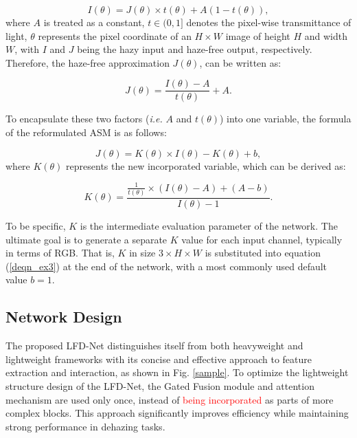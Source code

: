 \documentclass[lettersize,journal]{IEEEtran}
\begin{document}
\begin{equation}
    \label{deqn_ex1}
    I(\theta) = J(\theta) \times t(\theta) + A(1 - t(\theta)),
\end{equation}
where $A$ is treated as a constant, $t\in (0,1]$ denotes the pixel-wise transmittance of light, $\theta$ represents the pixel coordinate of an $H \times W$ image of height $H$ and width $W$, with $I$ and $J$ being the hazy input and haze-free output, respectively. Therefore, the haze-free approximation $J(\theta)$, can be written as:

\begin{equation}
    \label{deqn_ex2}
    J(\theta) = \frac{I(\theta) - A}{t(\theta)} + A.
\end{equation}

To encapsulate these two factors (\textit{i.e.} $A$ and $t(\theta)$) into one variable, the formula of the reformulated ASM is as follows:

\begin{equation}
    \label{deqn_ex3}
    J(\theta) = K(\theta) \times I(\theta) - K(\theta) + b,
\end{equation}
where $K(\theta)$ represents the new incorporated variable, which can be derived as:

\begin{equation}
    \label{deqn_ex4}
    K(\theta) = \frac{\frac{1}{t(\theta)} \times (I(\theta) - A) + (A - b)}{I(\theta) - 1}.
\end{equation}

To be specific, $K$ is the intermediate evaluation parameter of the network. The ultimate goal is to generate a separate $K$ value for each input channel, typically in terms of RGB. That is, $K$ in size $3 \times H \times W$ is substituted into equation (\ref{deqn_ex3}) at the end of the network, with a most commonly used default value $b = 1$.

\subsection{Network Design}
The proposed LFD-Net distinguishes itself from both heavyweight and lightweight frameworks with its concise and effective approach to feature extraction and interaction, as shown in Fig. \ref{sample}. %
To optimize the lightweight structure design of the LFD-Net, the Gated Fusion module and attention mechanism are used only once, instead of \textcolor{red}{being incorporated} as parts of more complex blocks. This approach significantly improves efficiency while maintaining strong performance in dehazing tasks.
\end{document}
